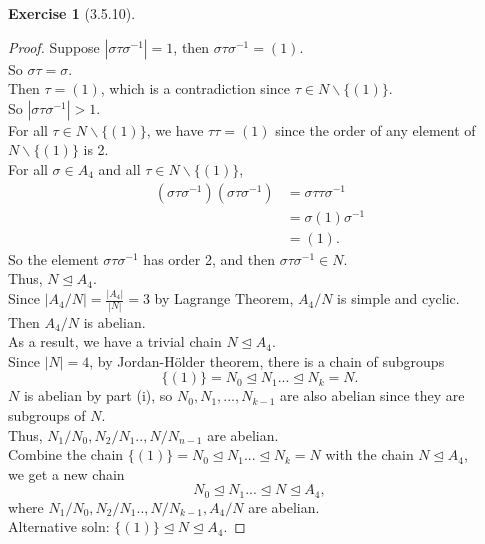 \documentclass{amsart}
\theoremstyle{plain}
\theoremstyle{definition}
\newtheorem{exer}[lem]{Exercise}
\begin{document}
\begin{exer}[3.5.10]
\begin{enumerate}[(a)]
\begin{proof}
  Suppose $|\sigma\tau\sigma^{-1}| = 1$, then $\sigma\tau\sigma^{-1} = (1)$. \\
  So $\sigma\tau = \sigma$.\\
  Then $\tau = (1)$, which is a contradiction since $\tau \in N\smallsetminus\{(1)\}$.\\
  So $|\sigma\tau\sigma^{-1}| > 1$.\\
  For all $\tau\in N\smallsetminus\{(1)\}$, we have $\tau \tau = (1)$ since the order of any element of $N\smallsetminus\{(1)\}$ is 2.\\
  For all $\sigma\in A_4$ and all $\tau\in N\smallsetminus\{(1)\}$,
  \begin{align*}
  	(\sigma\tau\sigma^{-1})(\sigma\tau\sigma^{-1}) &= \sigma\tau\tau\sigma^{-1} \\
  												   &= \sigma(1)\sigma^{-1} \\
  												   &= (1).
  \end{align*}
  	So the element $\sigma\tau\sigma^{-1}$ has order 2, and then $\sigma\tau\sigma^{-1} \in N$.\\
  	Thus, $N\unlhd A_4$.\\
	Since $|A_4/N| = \frac{|A_4|}{|N|} = 3$ by Lagrange Theorem, $A_4/N$ is simple and cyclic.\\
	Then $A_4/N$ is abelian.\\
	As a result, we have a trivial chain $N \unlhd A_4$.\\
  	Since $|N| = 4$, by Jordan-H\"older theorem, there is a chain of subgroups 
  	\[ \{(1)\} = N_0 \unlhd N_1...\unlhd N_k = N.\] 
  	$N$ is abelian by part (i), so $N_0,N_1, ..., N_{k-1}$ are also abelian since they are subgroups of $N$.\\ 
  	Thus, $N_1/N_0,N_2/N_1..,N/N_{n-1}$ are abelian.\\
	Combine the chain $\{(1)\} = N_0 \unlhd N_1...\unlhd N_k = N$ with the chain $N \unlhd A_4$,\\
	we get a new chain
	\[  N_0 \unlhd N_1...\unlhd  N \unlhd A_4,\]
	where $N_1/N_0, N_2/N_1..,N/N_{k-1}, A_4/N$ are abelian.\\
	Alternative soln: $\{(1)\} \unlhd N \unlhd A_4$.
 \end{proof}
  	
\end{enumerate}
\end{exer}
\end{document}
